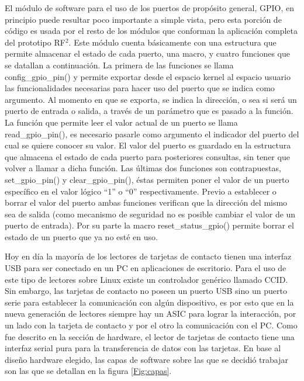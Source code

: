\bigskip
El módulo de software para el uso de los puertos de propósito general, GPIO, en principio puede resultar poco importante a simple vista, pero esta porción de código es usada por el resto de los módulos que conforman la aplicación completa del prototipo RF$^{2}$. 
Este módulo cuenta básicamente con una estructura que permite almacenar el estado de cada puerto, una macro, y cuatro funciones que se datallan a continuación.
La primera de las funciones se llama config\_gpio\_pin() y permite exportar desde el espacio kernel al espacio usuario las funcionalidades necesarias para hacer uso del puerto que se indica como argumento. Al momento en que se exporta, se indica la dirección, o sea si será un puerto de entrada o salida, a través de un parámetro que es pasado a la función.
La función que permite leer el valor actual de un puerto se llama read\_gpio\_pin(), es necesario pasarle como argumento el indicador del puerto del cual se quiere conocer su valor. El valor del puerto es guardado en la estructura que almacena el estado de cada puerto para posteriores consultas, sin tener que volver a llamar a dicha función.
Las últimas dos funciones son contrapuestas, set\_gpio\_pin() y clear\_gpio\_pin(), éstas permiten poner el valor de un puerto específico en el valor lógico “1” o “0” respectivamente. Previo a establecer o borrar el valor del puerto ambas funciones verifican que la dirección del mismo sea de salida (como mecanismo de seguridad no es posible cambiar el valor de un puerto de entrada).
Por su parte la macro reset\_status\_gpio() permite borrar el estado de un puerto que ya no esté en uso.


\bigskip
{}

Hoy en día la mayoría de los lectores de tarjetas de contacto tienen una interfaz USB para ser conectado en un PC en aplicaciones de escritorio. Para el uso de este tipo de lectores sobre Linux existe un controlador genérico llamado CCID.
Sin embargo, las tarjetas de contacto no poseen un puerto USB sino un puerto serie para establecer la comunicación con algún dispositivo, es por esto que en la nueva generación de lectores siempre hay un  ASIC para lograr la interacción, por un lado con la tarjeta de contacto y por el otro la comunicación con el PC.
Como fue descrito en la sección de hardware, el lector de tarjetas de contacto tiene una interfaz serial pura para la transferencia de datos con las tarjetas. En base al diseño hardware elegido, las capas de software sobre las que se decidió trabajar son las que se detallan en la figura \ref{Fig:capas}. 

